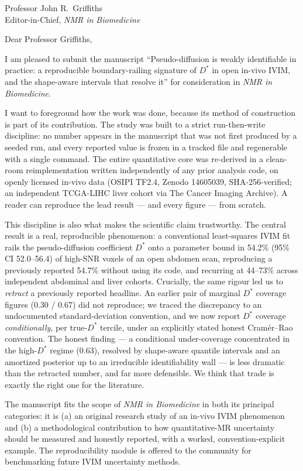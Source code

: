 \documentclass[11pt]{letter}
\begin{document}
\begin{letter}{Professor John R.\ Griffiths \\ Editor-in-Chief, \textit{NMR in Biomedicine}}

\opening{Dear Professor Griffiths,}

I am pleased to submit the manuscript ``Pseudo-diffusion is weakly identifiable in
practice: a reproducible boundary-railing signature of $D^{*}$ in open in-vivo IVIM, and
the shape-aware intervals that resolve it'' for consideration in \textit{NMR in
Biomedicine}.

I want to foreground how the work was done, because its method of construction is part of
its contribution. The study was built to a strict run-then-write discipline: no number
appears in the manuscript that was not first produced by a seeded run, and every reported
value is frozen in a tracked file and regenerable with a single command. The entire
quantitative core was re-derived in a clean-room reimplementation written independently
of any prior analysis code, on openly licensed in-vivo data (OSIPI TF2.4, Zenodo
14605039, SHA-256-verified; an independent TCGA-LIHC liver cohort via The Cancer Imaging
Archive). A reader can reproduce the lead result --- and every figure --- from scratch.

This discipline is also what makes the scientific claim trustworthy. The central result
is a real, reproducible phenomenon: a conventional least-squares IVIM fit rails the
pseudo-diffusion coefficient $D^{*}$ onto a parameter bound in 54.2\% (95\% CI
52.0--56.4) of high-SNR voxels of an open abdomen scan, reproducing a previously reported
54.7\% without using its code, and recurring at 44--73\% across independent abdominal and
liver cohorts. Crucially, the same rigour led us to \emph{retract} a previously reported
headline. An earlier pair of marginal $D^{*}$ coverage figures (0.30 / 0.67) did not
reproduce; we traced the discrepancy to an undocumented standard-deviation convention,
and we now report $D^{*}$ coverage \emph{conditionally}, per true-$D^{*}$ tercile, under
an explicitly stated honest Cram\'er--Rao convention. The honest finding --- a
conditional under-coverage concentrated in the high-$D^{*}$ regime (0.63), resolved by
shape-aware quantile intervals and an amortized posterior up to an irreducible
identifiability wall --- is less dramatic than the retracted number, and far more
defensible. We think that trade is exactly the right one for the literature.

The manuscript fits the scope of \textit{NMR in Biomedicine} in both its principal
categories: it is (a) an original research study of an in-vivo IVIM phenomenon and (b) a
methodological contribution to how quantitative-MR uncertainty should be measured and
honestly reported, with a worked, convention-explicit example. The reproducibility module
is offered to the community for benchmarking future IVIM uncertainty methods.


\end{letter}
\end{document}
